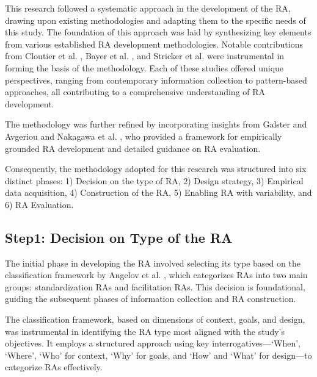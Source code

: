 \documentclass[review]{elsarticle}
\begin{document}
This research followed a systematic approach in the development of the RA, drawing upon existing methodologies and adapting them to the specific needs of this study. The foundation of this approach was laid by synthesizing key elements from various established RA development methodologies. Notable contributions from Cloutier et al. \cite{Cloutier}, Bayer et al. \cite{bayer2004definition}, and Stricker et al. \cite{stricker2010creating} were instrumental in forming the basis of the methodology. Each of these studies offered unique perspectives, ranging from contemporary information collection to pattern-based approaches, all contributing to a comprehensive understanding of RA development.

The methodology was further refined by incorporating insights from Galster and Avgeriou \cite{galster2011empirically} and Nakagawa et al. \cite{nakagawa2014consolidating}, who provided a framework for empirically grounded RA development and detailed guidance on RA evaluation. 

Consequently, the methodology adopted for this research was structured into six distinct phases: 1) Decision on the type of RA, 2) Design strategy, 3) Empirical data acquisition, 4) Construction of the RA, 5) Enabling RA with variability, and 6) RA Evaluation.




\subsection{Step1: Decision on Type of the RA}

The initial phase in developing the RA involved selecting its type based on the classification framework by Angelov et al. \cite{angelov2009classification}, which categorizes RAs into two main groups: standardization RAs and facilitation RAs. This decision is foundational, guiding the subsequent phases of information collection and RA construction. 

The classification framework, based on dimensions of context, goals, and design, was instrumental in identifying the RA type most aligned with the study's objectives. It employs a structured approach using key interrogatives—‘When’, ‘Where’, ‘Who’ for context, ‘Why’ for goals, and ‘How’ and ‘What’ for design—to categorize RAs effectively.
\end{document}
